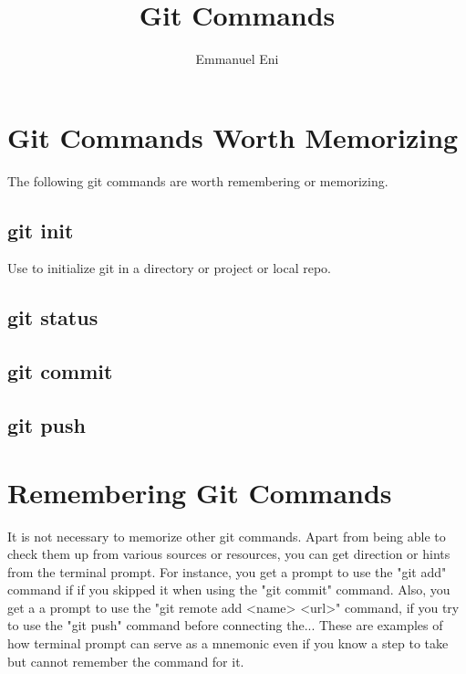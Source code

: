 \documentclass{article}
\title{Git Commands}
\author{Emmanuel Eni}
\begin{document}
\maketitle
\section{Git Commands Worth Memorizing}
The following git commands are worth remembering or memorizing.
\subsection{git init}
Use to initialize git in a directory or project or local repo.
\subsection{git status}
\subsection{git commit}
\subsection{git push}
\section{Remembering Git Commands}
It is not necessary to memorize other git commands. Apart from being able to check them up from various sources or resources, you can get direction or hints from the terminal prompt. For instance, you get a prompt to use the "git add" command if if you skipped it when using the "git commit" command. Also, you get a a prompt to use the "git remote add <name> <url>" command, if you try to use the "git push" command before connecting the... These are examples of how terminal prompt can serve as a mnemonic even if you know a step to take but cannot remember the command for it.
\end{document}
